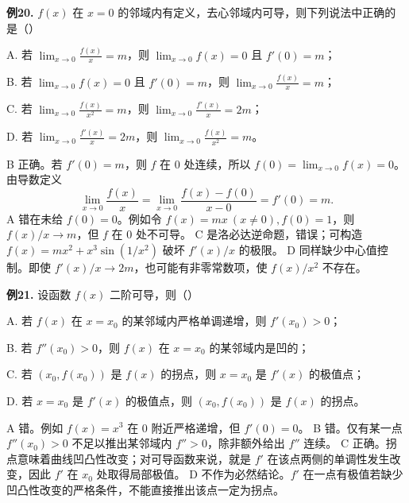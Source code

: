 \begin{problemblock}
\textbf{例20.} \(f(x)\) 在 \(x=0\) 的邻域内有定义，去心邻域内可导，则下列说法中正确的是（\quad）

A. 若 \(\displaystyle\lim_{x\to0}\frac{f(x)}x=m\)，则 \(\displaystyle\lim_{x\to0}f(x)=0\) 且 \(f'(0)=m\)；

B. 若 \(\displaystyle\lim_{x\to0}f(x)=0\) 且 \(f'(0)=m\)，则 \(\displaystyle\lim_{x\to0}\frac{f(x)}x=m\)；

C. 若 \(\displaystyle\lim_{x\to0}\frac{f(x)}{x^2}=m\)，则 \(\displaystyle\lim_{x\to0}\frac{f'(x)}x=2m\)；

D. 若 \(\displaystyle\lim_{x\to0}\frac{f'(x)}x=2m\)，则 \(\displaystyle\lim_{x\to0}\frac{f(x)}{x^2}=m\)。
\end{problemblock}
\begin{solutionblock}
B 正确。若 \(f'(0)=m\)，则 \(f\) 在 0 处连续，所以 \(f(0)=\lim_{x\to0}f(x)=0\)。由导数定义
\[
\lim_{x\to0}\frac{f(x)}x
=\lim_{x\to0}\frac{f(x)-f(0)}{x-0}=f'(0)=m.
\]
A 错在未给 \(f(0)=0\)。例如令 \(f(x)=mx\ (x\ne0), f(0)=1\)，则 \(f(x)/x\to m\)，但 \(f\) 在 0 处不可导。
C 是洛必达逆命题，错误；可构造 \(f(x)=mx^2+x^3\sin(1/x^2)\) 破坏 \(f'(x)/x\) 的极限。
D 同样缺少中心值控制。即使 \(f'(x)/x\to2m\)，也可能有非零常数项，使 \(f(x)/x^2\) 不存在。
\end{solutionblock}

\begin{problemblock}
\textbf{例21.} 设函数 \(f(x)\) 二阶可导，则（\quad）

A. 若 \(f(x)\) 在 \(x=x_0\) 的某邻域内严格单调递增，则 \(f'(x_0)>0\)；

B. 若 \(f''(x_0)>0\)，则 \(f(x)\) 在 \(x=x_0\) 的某邻域内是凹的；

C. 若 \((x_0,f(x_0))\) 是 \(f(x)\) 的拐点，则 \(x=x_0\) 是 \(f'(x)\) 的极值点；

D. 若 \(x=x_0\) 是 \(f'(x)\) 的极值点，则 \((x_0,f(x_0))\) 是 \(f(x)\) 的拐点。
\end{problemblock}
\begin{solutionblock}
A 错。例如 \(f(x)=x^3\) 在 0 附近严格递增，但 \(f'(0)=0\)。
B 错。仅有某一点 \(f''(x_0)>0\) 不足以推出某邻域内 \(f''>0\)，除非额外给出 \(f''\) 连续。
C 正确。拐点意味着曲线凹凸性改变；对可导函数来说，就是 \(f'\) 在该点两侧的单调性发生改变，因此 \(f'\) 在 \(x_0\) 处取得局部极值。
D 不作为必然结论。\(f'\) 在一点有极值若缺少凹凸性改变的严格条件，不能直接推出该点一定为拐点。
\end{solutionblock}

